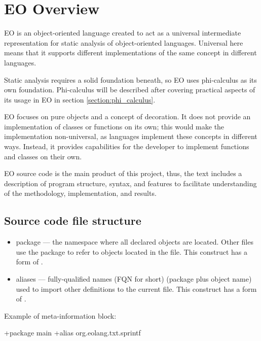 \chapter{EO Overview}
\label{chapter:eo_overview}

EO is an object-oriented language created to act as a universal intermediate representation for static analysis of object-oriented languages. Universal here means that it supports different implementations of the same concept in different languages.

Static analysis requires a solid foundation beneath, so EO uses phi-calculus as its own foundation. Phi-calculus will be described after covering practical aspects of its usage in EO in section \ref{section:phi_calculus}.

EO focuses on pure objects and a concept of decoration. It does not provide an implementation of classes or functions on its own; this would make the implementation non-universal, as languages implement these concepts in different ways. Instead, it provides capabilities for the developer to implement functions and classes on their own.

EO source code is the main product of this project, thus, the text includes a description of program structure, syntax, and features to facilitate understanding of the methodology, implementation, and results.

\section{Source code file structure}

\begin{itemize}
    \item package — the namespace where all declared objects are located. Other files use the package to refer to objects located in the file. This construct has a form of .
    \item aliases — fully-qualified names (FQN for short) (package plus object name) used to import other definitions to the current file. This construct has a form of .
\end{itemize}

Example of meta-information block:

\begin{ffcode}
+package main
+alias org.eolang.txt.sprintf
\end{ffcode}

